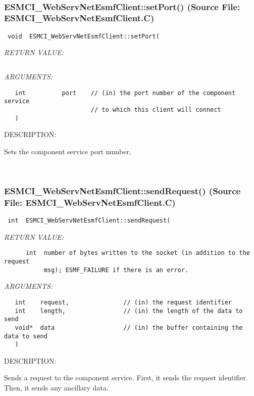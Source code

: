\mbox{}\hrulefill\
 
\subsubsection{ESMCI\_WebServNetEsmfClient::setPort() (Source File: ESMCI\_WebServNetEsmfClient.C)}


  
\begin{verbatim} void  ESMCI_WebServNetEsmfClient::setPort(\end{verbatim}{\em RETURN VALUE:}
\begin{verbatim} \end{verbatim}{\em ARGUMENTS:}
\begin{verbatim}   int          port    // (in) the port number of the component service
                        // to which this client will connect
   )\end{verbatim}
{\sf DESCRIPTION:\\ }


      Sets the component service port number.
   
 
\mbox{}\hrulefill\
 
\subsubsection{ESMCI\_WebServNetEsmfClient::sendRequest() (Source File: ESMCI\_WebServNetEsmfClient.C)}


  
\begin{verbatim} int  ESMCI_WebServNetEsmfClient::sendRequest(\end{verbatim}{\em RETURN VALUE:}
\begin{verbatim}      int  number of bytes written to the socket (in addition to the request
           msg); ESMF_FAILURE if there is an error.\end{verbatim}{\em ARGUMENTS:}
\begin{verbatim}   int    request,               // (in) the request identifier
   int    length,                // (in) the length of the data to send
   void*  data                   // (in) the buffer containing the data to send
   )\end{verbatim}
{\sf DESCRIPTION:\\ }


      Sends a request to the component service.  First, it sends the request
      identifier.  Then, it sends any ancillary data.
   
